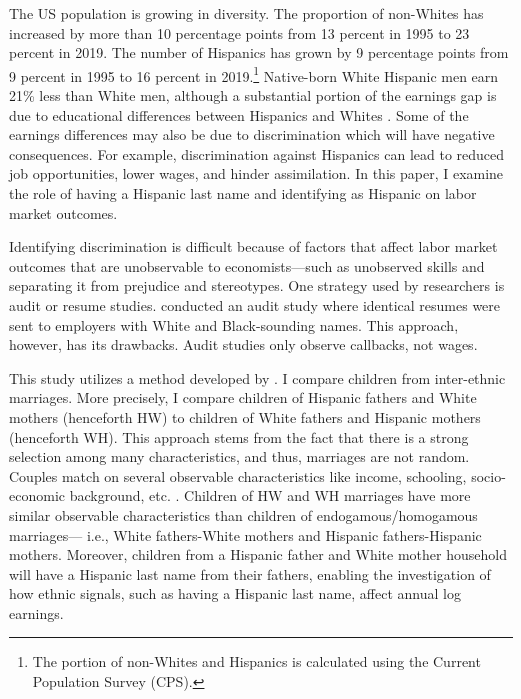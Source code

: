 The US population is growing in diversity. The proportion of non-Whites has increased by more than 10 percentage points from 13 percent in 1995 to 23 percent in 2019. The number of Hispanics has grown by 9 percentage points from 9 percent in 1995 to 16 percent in 2019.\footnote{The portion of non-Whites and Hispanics is calculated using the Current Population Survey (CPS).} Native-born White Hispanic men earn 21\% less than White men, although a substantial portion of the earnings gap is due to educational differences between Hispanics and Whites \autocite{duncan2006hispanics, duncan2018identifying, duncan2018socioeconomic}. Some of the earnings differences may also be due to discrimination which will have negative consequences. For example, discrimination against Hispanics can lead to reduced job opportunities, lower wages, and hinder assimilation. In this paper, I examine the role of having a Hispanic last name and identifying as Hispanic on labor market outcomes. 

Identifying discrimination is difficult because of factors that affect labor market outcomes that are unobservable to economists---such as unobserved skills and separating it from prejudice and stereotypes. One strategy used by researchers is audit or resume studies. \textcite{bertrand2004emily} conducted an audit study where identical resumes were sent to employers with White and Black-sounding names. This approach, however, has its drawbacks. Audit studies only observe callbacks, not wages. 

This study utilizes a method developed by \textcite{rubinstein2014pride}. I compare children from inter-ethnic marriages. More precisely, I compare children of Hispanic fathers and White mothers (henceforth HW) to children of White fathers and Hispanic mothers (henceforth  WH). This approach stems from the fact that there is a strong selection among many characteristics, and thus, marriages are not random. Couples match on several observable characteristics like income, schooling, socio-economic background, etc. \autocite{averettBetterWorseRelationship2008, averettEconomicRealityBeauty1996, beckerTheoryMarriagePart1973, beckerTheoryMarriagePart1974, beckerTreatiseFamily1993, browningCollectiveUnitaryModels2006, chiapporiFatterAttractionAnthropometric2012}. Children of HW and WH marriages have more similar observable characteristics than children of endogamous/homogamous marriages--- i.e., White fathers-White mothers and Hispanic fathers-Hispanic mothers. Moreover, children from a Hispanic father and White mother household will have a Hispanic last name from their fathers, enabling the investigation of how ethnic signals, such as having a Hispanic last name, affect annual log earnings.

